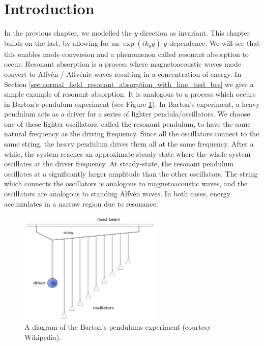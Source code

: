 \section{Introduction}

In the previous chapter, we modelled the $y$-direction as invariant. This chapter builds on the last, by allowing for an $\exp(ik_y y)$  $y$-dependence. We will see that this enables mode conversion and a phenomenon called resonant absorption to occur.
Resonant absorption is a process where magnetoacoustic waves mode convert to Alfv\'en / Alfv\'enic waves resulting in a concentration of energy. In Section \ref{sec:normal_field_resonant_absorption_with_line_tied_bcs} we give a simple example of resonant absorption. It is analogous to a process which occurs in Barton's pendulum experiment (see Figure \ref{fig:bartons_pendulums}). In Barton's experiment, a heavy pendulum acts as a driver for a series of lighter pendula/oscillators. We choose one of these lighter oscillators, called the resonant pendulum, to have the same natural frequency as the driving frequency. Since all the oscillators connect to the same string, the heavy pendulum drives them all at the same frequency. After a while, the system reaches an approximate steady-state where the whole system oscillates at the driver frequency. At steady-state, the resonant pendulum oscillates at a significantly larger amplitude than the other oscillators. The string which connects the oscillators is analogous to magnetoacoustic waves, and the oscillators are analogous to standing Alfv\'en waves. In both cases, energy accumulates in a narrow region due to resonance.

\begin{figure}
    \centering
    \vspace{-20pt}
    \includegraphics[width = 0.6\textwidth]{figures/chapter04/bartons_pendulums.png}
    \vspace{-15pt}
    \caption{A diagram of the Barton's pendulums experiment (courtesy Wikipedia).}
    \vspace{-10pt}
    \label{fig:bartons_pendulums}
\end{figure}


